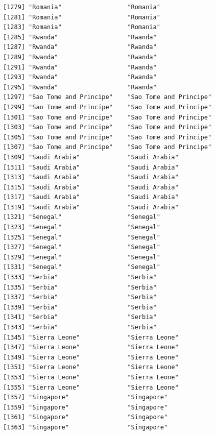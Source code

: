 \documentclass[
  letterpaper,
  DIV=11,
  numbers=noendperiod]{scrreprt}
\begin{document}
\begin{verbatim}
[1279] "Romania"                  "Romania"                 
[1281] "Romania"                  "Romania"                 
[1283] "Romania"                  "Romania"                 
[1285] "Rwanda"                   "Rwanda"                  
[1287] "Rwanda"                   "Rwanda"                  
[1289] "Rwanda"                   "Rwanda"                  
[1291] "Rwanda"                   "Rwanda"                  
[1293] "Rwanda"                   "Rwanda"                  
[1295] "Rwanda"                   "Rwanda"                  
[1297] "Sao Tome and Principe"    "Sao Tome and Principe"   
[1299] "Sao Tome and Principe"    "Sao Tome and Principe"   
[1301] "Sao Tome and Principe"    "Sao Tome and Principe"   
[1303] "Sao Tome and Principe"    "Sao Tome and Principe"   
[1305] "Sao Tome and Principe"    "Sao Tome and Principe"   
[1307] "Sao Tome and Principe"    "Sao Tome and Principe"   
[1309] "Saudi Arabia"             "Saudi Arabia"            
[1311] "Saudi Arabia"             "Saudi Arabia"            
[1313] "Saudi Arabia"             "Saudi Arabia"            
[1315] "Saudi Arabia"             "Saudi Arabia"            
[1317] "Saudi Arabia"             "Saudi Arabia"            
[1319] "Saudi Arabia"             "Saudi Arabia"            
[1321] "Senegal"                  "Senegal"                 
[1323] "Senegal"                  "Senegal"                 
[1325] "Senegal"                  "Senegal"                 
[1327] "Senegal"                  "Senegal"                 
[1329] "Senegal"                  "Senegal"                 
[1331] "Senegal"                  "Senegal"                 
[1333] "Serbia"                   "Serbia"                  
[1335] "Serbia"                   "Serbia"                  
[1337] "Serbia"                   "Serbia"                  
[1339] "Serbia"                   "Serbia"                  
[1341] "Serbia"                   "Serbia"                  
[1343] "Serbia"                   "Serbia"                  
[1345] "Sierra Leone"             "Sierra Leone"            
[1347] "Sierra Leone"             "Sierra Leone"            
[1349] "Sierra Leone"             "Sierra Leone"            
[1351] "Sierra Leone"             "Sierra Leone"            
[1353] "Sierra Leone"             "Sierra Leone"            
[1355] "Sierra Leone"             "Sierra Leone"            
[1357] "Singapore"                "Singapore"               
[1359] "Singapore"                "Singapore"               
[1361] "Singapore"                "Singapore"               
[1363] "Singapore"                "Singapore"               

\end{verbatim}
\end{document}
